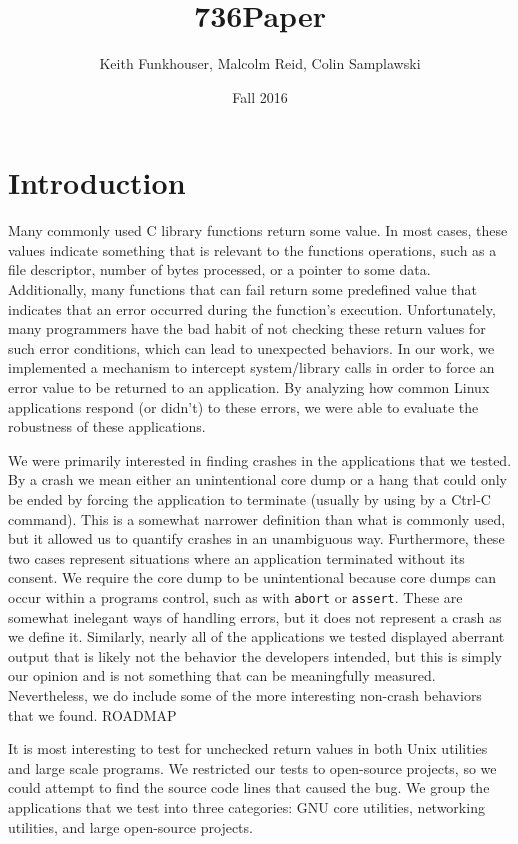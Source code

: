 \documentclass[10pt]{article}
\title{736Paper}
\author{Keith Funkhouser, Malcolm Reid, Colin Samplawski}
\date{Fall 2016}
\begin{document}
\setlength{\baselineskip}{18pt}
\maketitle

\section{Introduction}
Many commonly used C library functions return some value. In most cases, these values indicate something that is relevant to the  functions operations, such as a file descriptor, number of bytes processed, or a pointer to some data. Additionally, many functions that can fail return some predefined value that indicates that an error occurred during the function's execution. Unfortunately, many programmers have the bad habit of not checking these return values for such error conditions, which can lead to unexpected behaviors. In our work, we implemented a mechanism to intercept system/library calls in order to force an error value to be returned to an application. By analyzing how common Linux applications respond (or didn't) to these errors, we were able to evaluate the robustness of these applications.

We were primarily interested in finding crashes in the applications that we tested. By a crash we mean either an unintentional core dump or a hang that could only be ended by forcing the application to terminate (usually by using by a Ctrl-C command). This is a somewhat narrower definition than what is commonly used, but it allowed us to quantify crashes in an unambiguous way. Furthermore, these two cases represent situations where an application terminated without its consent. We require the core dump to be unintentional because core dumps can occur within a programs control, such as with \texttt{abort} or \texttt{assert}. These are somewhat inelegant ways of handling errors, but it does not represent a crash as we define it. Similarly, nearly all of the applications we tested displayed aberrant output that is likely not the behavior the developers intended, but this is simply our opinion and is not something that can be meaningfully measured. Nevertheless, we do include some of the more interesting non-crash behaviors that we found. ROADMAP

It is most interesting to test for unchecked return values in both Unix utilities and large scale programs. We restricted our tests to open-source projects, so we could attempt to find the source code lines that caused the bug. We group the applications that we test into three categories: GNU core utilities, networking utilities, and large open-source projects.
\end{document}
